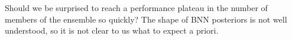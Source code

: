 \documentclass[../thesis.tex]{subfiles}
\begin{document}
Should we be surprised to reach a performance plateau in the number of members of the ensemble so quickly? The shape of BNN posteriors is not well understood, so it is not clear to us what to expect a priori.
\bigskip
\end{document}
